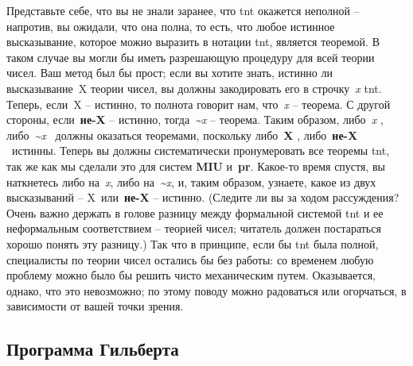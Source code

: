 \documentclass[../main.tex]{subfiles}
\begin{document}
Представьте себе, что вы не знали заранее, что \acs{tnt} окажется неполной \--- напротив, вы ожидали, что она полна, то есть, что любое истинное высказывание, которое можно выразить в нотации \acs{tnt}, является теоремой. В таком случае вы могли бы иметь разрешающую процедуру для всей теории чисел. Ваш метод был бы прост; если вы хотите знать, истинно ли высказывание~X теории чисел, вы должны закодировать его в строчку~\emph{x} \acs{tnt}. Теперь, если~X \--- истинно, то полнота говорит нам, что~\emph{x} \--- теорема. С другой стороны, если~\textbf{не-X} \--- истинно, тогда~\emph{\textasciitilde x} \--- теорема. Таким образом, либо~\emph{x} , либо~\emph{\textasciitilde x} ~должны оказаться теоремами, поскольку либо~\textbf{X} , либо~\textbf{не-X} ~истинны. Теперь вы должны систематически пронумеровать все теоремы \acs{tnt}, так же как мы сделали это для систем \textbf{MIU} и~\textbf{pr}. Какое-то время спустя, вы наткнетесь либо на~\emph{x}, либо на~\emph{\textasciitilde x}, и, таким образом, узнаете, какое из двух высказываний \--- X~или~\textbf{не-X} \--- истинно. (Следите ли вы за ходом рассуждения? Очень важно держать в голове разницу между формальной системой \acs{tnt} и ее неформальным соответствием \--- теорией чисел; читатель должен постараться хорошо понять эту разницу.) Так что в принципе, если бы \acs{tnt} была полной, специалисты по теории чисел остались бы без работы: со временем любую проблему можно было бы решить чисто механическим путем. Оказывается, однако, что это невозможно; по этому поводу можно радоваться или огорчаться, в зависимости от вашей точки зрения.


\subsection{Программа Гильберта}
\end{document}
